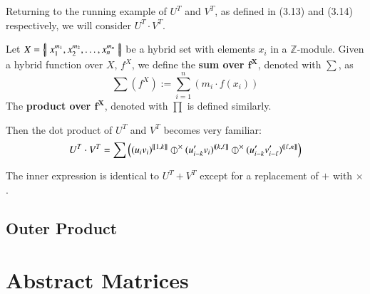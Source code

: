 Returning to the running example of $U^T$ and $V^T$, as defined in (3.13) and (3.14) respectively, we will consider $U^T \cdot V^T$.

\begin{definition}
	Let $X = \hset{x_1^{m_1}, x_2^{m_2}, \ldots , x_n^{m_n} }$ be a hybrid set with elements $x_i$ in a $\mathbb{Z}$-module.
	Given a hybrid function over $X$,  $f^X$, we define the \textbf{sum over $\boldsymbol{f^X}$}, denoted with $\sum$, as
	\begin{equation}
		\sum \! \left( f^X \right)  := \sum_{i=1}^n \left( m_i \cdot f(x_i) \right)
	\end{equation}
	The \textbf{product over $\boldsymbol{f^X}$}, denoted with $\prod$ is defined similarly.
\end{definition}

Then the dot product of $U^T$ and $V^T$ becomes very familiar:
\begin{equation}
	U^T \cdot V^T = \sum \left( (u_i v_i)^{[\![1, k]\!]} 
		\hjoin[\times] (u'_{i-k} v_i)^{(\!(k,\ell]\!]} 
		\hjoin[\times] (u'_{i-k} v'_{i-\ell})^{(\!(\ell,n]\!]} \right)
\end{equation}

The inner expression is identical to $U^T + V^T$ except for a replacement of $+$ with $\times$.

\subsection{Outer Product}







\newpage

\section{Abstract Matrices}

